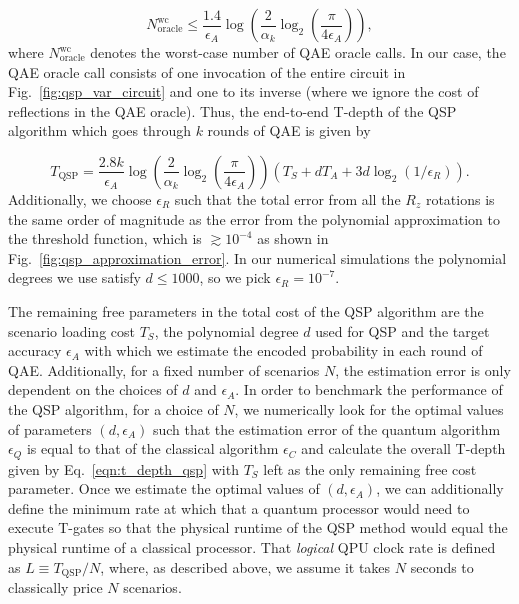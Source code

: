 \begin{enumerate}
\begin{equation}
\label{eqn:AE_oracle_calls}
N_{\text{oracle}}^{\text{wc}}
\leq \frac{1.4}{\epsilon_A}\log\left(\frac{2}{\alpha_k} \log_2\left(\frac{\pi}{4\epsilon_A}\right)\right),
\end{equation}
where $N_{\text{oracle}}^{\text{wc}}$ denotes the worst-case number of QAE oracle calls.
In our case, the QAE oracle call consists of one invocation of the entire circuit in Fig.~\ref{fig:qsp_var_circuit} and one to its inverse (where we ignore the cost of reflections in the QAE oracle).
Thus, the end-to-end T-depth of the QSP \var{} algorithm which goes through $k$ rounds of QAE is given by

\begin{equation}
	\label{eqn:t_depth_qsp}
	T_{\textrm{QSP}} = \frac{2.8k}{\epsilon_A}\log\left(\frac{2}{\alpha_k} \log_2\left(\frac{\pi}{4\epsilon_A}\right)\right) \left(T_S + dT_A + 3d\log_2(1/\epsilon_R) \right).
\end{equation}
Additionally, we choose $\epsilon_R$ such that the total error from all the $R_z$ rotations is the same order of magnitude as the error from the polynomial approximation to the threshold function, which is $\gtrsim 10^{-4}$ as shown in Fig.~\ref{fig:qsp_approximation_error}.
In our numerical simulations the polynomial degrees we use satisfy $d\le 1000$, so we pick $\epsilon_R=10^{-7}$.

The remaining free parameters in the total cost of the QSP algorithm are the scenario loading cost $T_S$, the polynomial degree $d$ used for QSP and the target accuracy $\epsilon_A$ with which we estimate the encoded probability in each round of QAE.
Additionally, for a fixed number of scenarios $N$, the \var{} estimation error is only dependent on the choices of $d$ and $\epsilon_A$.
In order to benchmark the performance of the QSP algorithm, for a choice of $N$, we numerically look for the optimal values of parameters $(d, \epsilon_A)$ such that the estimation error of the quantum algorithm $\epsilon_Q$ is equal to that of the classical algorithm $\epsilon_C$ and calculate the overall T-depth given by Eq.~\eqref{eqn:t_depth_qsp} with $T_S$ left as the only remaining free cost parameter.
Once we estimate the optimal values of $(d, \epsilon_A)$, we can additionally define the minimum rate at which that a quantum processor would need to execute T-gates so that the physical runtime of the QSP method would equal the physical runtime of a classical processor.
That \emph{logical} QPU clock rate is defined as $L \equiv T_{\textrm{QSP}}/N$, where, as described above, we assume it takes $N$ seconds to classically price $N$ scenarios.


\end{enumerate}
